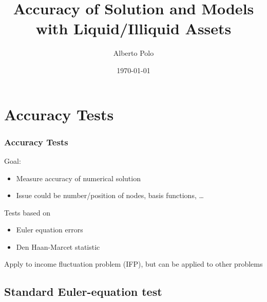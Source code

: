 \documentclass{beamer}
\begin{document}
\title{Accuracy of Solution and Models with Liquid/Illiquid Assets}
\author[Polo (NYU)]{Alberto Polo}
\date{\today \\}

\small

\begin{frame}
\titlepage
\end{frame}

\section{Accuracy Tests}

\begin{frame}
  \frametitle{Accuracy Tests}
  \begin{block}{Goal:}
    \begin{itemize}
      \item Measure accuracy of numerical solution
      \item Issue could be number/position of nodes, basis functions, \ldots
    \end{itemize}
  \end{block}

  \begin{block}{Tests based on}
    \begin{itemize}
      \item Euler equation errors
      \item Den Haan-Marcet statistic
    \end{itemize}
  \end{block}
\bigskip
  Apply to income fluctuation problem (IFP), but can be applied to other problems
\end{frame}

\subsection{Standard Euler-equation test}
\end{document}
